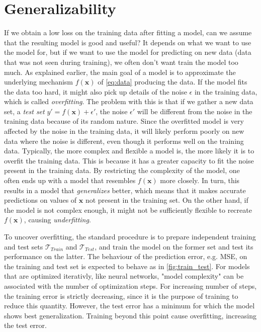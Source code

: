 \section{Generalizability}\label{sec:Generalizability}
If we obtain a low loss on the training data after fitting a model, can we assume that the resulting model is good and useful? It depends on what we want to use the model for, but if we want to use the model for predicting on new data (data that was not seen during training), we often don't want train the model too much. As explained earlier, the main goal of a model is to approximate the underlying mechanism $f(\boldsymbol{x})$ of \autoref{eq:data} producing the data. If the model fits the data too hard, it might also pick up details of the noise $\epsilon$ in the training data, which is called \emph{overfitting}. The problem with this is that if we gather a new data set, a \emph{test set} $y' = f(\boldsymbol{x}) + \epsilon'$, the noise $\epsilon'$ will be different from the noise in the training data because of its random nature. Since the overfitted model is very affected by the noise in the training data, it will likely perform poorly on new data where the noise is different, even though it performs well on the training data. Typically, the more complex and flexible a model is, the more likely it is to overfit the training data. This is because it has a greater capacity to fit the noise present in the training data. By restricting the complexity of the model, one often ends up with a model that resembles $f(\boldsymbol{x})$ more closely. In turn, this results in a model
that \emph{generalizes} better, which means that it makes accurate predictions on values of $\boldsymbol{x}$ not present in the training set. On the other hand, if the model is not complex enough, it might not be sufficiently flexible to recreate $f(\boldsymbol{x})$, causing \emph{underfitting}.

To uncover overfitting, the standard procedure is to prepare independent training and test sets $\mathcal{T}_{Train}$ and $\mathcal{T}_{Test}$, and train the model on the former set and test its performance on the latter. The behaviour of the prediction error, e.g. MSE, on the training and test set is expected to behave as in \autoref{fig:train_test}. For models that are optimized iterativly, like neural networks, "model complexity" can be associated with the number of optimization steps. For increasing number of steps, the training error is strictly decreasing, since it is the purpose of training to reduce this quantity. However, the test error has a minimum for which the model shows best generalization. Training beyond this point cause overfitting, increasing the test error. 

